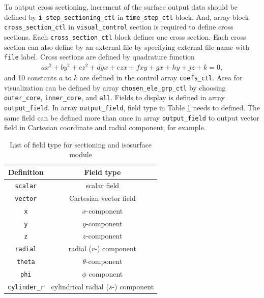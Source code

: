 To output cross sectioning, increment of the surface output data should be defined by \verb|i_step_sectioning_ctl| in \verb|time_step_ctl| block. And, array block \verb|cross_section_ctl| in \verb|visual_control| section is required to define cross sections. Each \verb|cross_section_ctl| block defines one cross section. Each cross section can also define by an external file by specifying external file name with \verb|file| label.
%
Cross sections are defined by quadrature function
%
\begin{eqnarray*}
a x^2 + b y^2 + c z^2 + d y x + e z x + f x y + g x + h y + j z + k = 0,
\end{eqnarray*}
and 10 constants $a$ to $k$ are defined in the control array \verb|coefs_ctl|. Area for visualization can be defined by array \verb|chosen_ele_grp_ctl| by choosing \verb|outer_core|, \verb|inner_core|, and \verb|all|. Fields to display is defined in array \verb|output_field|. In array \verb|output_field|, field type in Table \ref{table:field_type} needs to defined. The same field can be defined more than once in array \verb|output_field| to output vector field in Cartesian coordinate and radial component, for example.
%
\begin{table}[htp]
\caption{List of field type for sectioning and isosurface module}
\label{table:field_type}
\begin{center} 
\begin{tabular}{|c|c|}
\hline
 Definition & Field type  \\ \hline \hline
 \verb|scalar| & scalar field  \\ \hline
 \verb|vector| & Cartesian vector field \\ \hline
 \verb|x| & $x$-component  \\ \hline
 \verb|y| & $y$-component  \\ \hline
 \verb|z| & $z$-component  \\ \hline
 \verb|radial| & radial ($r$-) component  \\ \hline
 \verb|theta| & $\theta$-component  \\ \hline
 \verb|phi| & $\phi$ component  \\ \hline
 \verb|cylinder_r| & cylindrical radial ($s$-) component  \\ \hline
\end{tabular}
\end{center}
\end{table}
%
